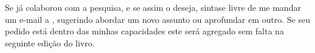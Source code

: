 \begin{patrocinio}
\begin{center}
{\begin{minipage}[c][]{13.5cm}
    \hspace{0.5cm}
    Se já colaborou com a pesquisa, e se assim o deseja, 
    sintase livre de me mandar um e-mail a \ImprimirEmail, 
    sugerindo abordar um novo assunto ou aprofundar em outro.
    Se seu pedido está dentro das minhas capacidades 
    este será agregado sem falta na seguinte edição do livro.\\

    \begin{flushright}
    \myauthor ~\\ 
    \end{flushright}

	\end{minipage}}
	\end{center}
\end{patrocinio}%

